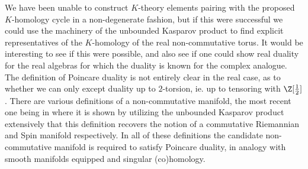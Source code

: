 We have been unable to construct $K$-theory elements pairing with the proposed $K$-homology cycle in a non-degenerate fashion, but if this were successful we could use the machinery of the unbounded Kasparov product to find explicit representatives of the $K$-homology of the real non-commutative torus. It would be interesting to see if this were possible, and also see if one could show real duality for the real algebras for which the duality is known for the complex analogue. The definition of Poincare duality is not entirely clear in the real case, as to whether we can only except duality up to $2$-torsion, ie. up to tensoring with $\Z[\frac{1}{2}]$. There are various definitions of a non-commutative manifold, the most recent one being in \cite{rennie2} where it is shown by utilizing the unbounded Kasparov product extensively that this definition recovers the notion of a commutative Riemannian and Spin manifold respectively. In all of these definitions the candidate non-commutative manifold is required to satisfy Poincare duality, in analogy with smooth manifolds equipped and singular (co)homology.



